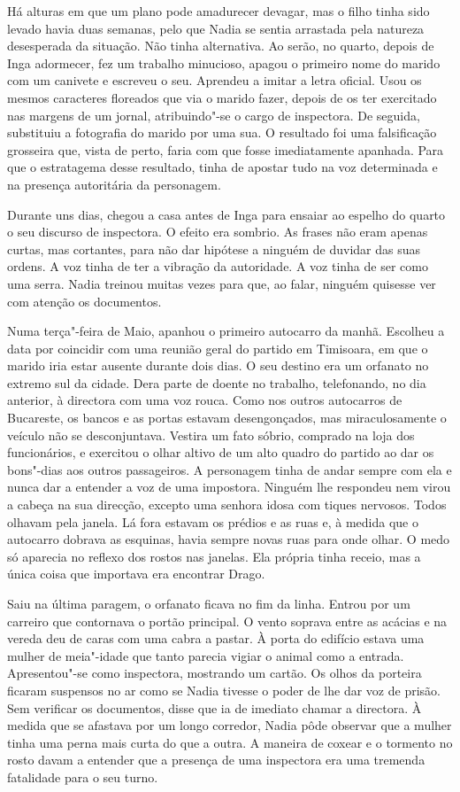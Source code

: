 Há alturas em que um plano pode amadurecer devagar, mas o filho tinha
sido levado havia duas semanas, pelo que Nadia se sentia arrastada pela
natureza desesperada da situação. Não tinha alternativa. Ao serão, no
quarto, depois de Inga adormecer, fez um trabalho minucioso, apagou o
primeiro nome do marido com um canivete e escreveu o seu. Aprendeu a
imitar a letra oficial. Usou os mesmos caracteres floreados que via o
marido fazer, depois de os ter exercitado nas margens de um jornal,
atribuindo"-se o cargo de inspectora. De seguida, substituiu a fotografia do
marido por uma sua. O resultado foi uma falsificação grosseira que,
vista de perto, faria com que fosse imediatamente apanhada. Para que o
estratagema desse resultado, tinha de apostar tudo na voz determinada e
na presença autoritária da personagem.

Durante uns dias, chegou a casa antes de Inga para ensaiar ao espelho do
quarto o seu discurso de inspectora. O efeito era sombrio. As frases não
eram apenas curtas, mas cortantes, para não dar hipótese a ninguém de
duvidar das suas ordens. A voz tinha de ter a vibração da autoridade.
A voz tinha de ser como uma serra. Nadia treinou muitas vezes para que,
ao falar, ninguém quisesse ver com atenção os documentos.

Numa terça"-feira de Maio, apanhou o primeiro autocarro da manhã.
Escolheu a data por coincidir com uma reunião geral do partido em
Timisoara, em que o marido iria estar ausente durante dois dias. O seu
destino era um orfanato no extremo sul da cidade. Dera parte de doente
no
trabalho, telefonando, no dia anterior, à directora com uma voz rouca.
Como nos outros autocarros de Bucareste, os bancos e as portas estavam
desengonçados, mas miraculosamente o veículo não se desconjuntava.
Vestira um fato sóbrio, comprado na loja dos funcionários, e exercitou o
olhar altivo de um alto quadro do partido ao dar os bons"-dias aos outros passageiros. A personagem tinha de andar sempre com ela
e nunca dar a entender a voz de uma impostora. Ninguém lhe respondeu
nem virou a cabeça na sua direcção, excepto uma senhora idosa com tiques
nervosos. Todos olhavam pela janela. Lá fora estavam os prédios e as
ruas e, à medida que o autocarro dobrava as esquinas, havia sempre novas
ruas para onde olhar. O medo só aparecia no reflexo dos rostos nas
janelas. Ela própria tinha receio, mas a única coisa que importava era
encontrar Drago.

Saiu na última paragem, o orfanato ficava no fim da linha. Entrou por um
carreiro que contornava o portão principal. O vento soprava entre as
acácias e na vereda deu de caras com uma cabra a pastar. À porta do
edifício estava uma mulher de meia"-idade que tanto parecia vigiar o
animal como a entrada. Apresentou"-se como inspectora, mostrando um
cartão. Os olhos da porteira ficaram suspensos no ar como se Nadia
tivesse o poder de lhe dar voz de prisão. Sem verificar os documentos,
disse que ia de imediato chamar a directora. À medida que se afastava
por um longo corredor, Nadia pôde observar que a mulher tinha uma perna
mais curta do que a outra. A maneira de coxear e o tormento no rosto
davam a entender que a presença de uma inspectora era uma tremenda
fatalidade para o seu turno.


